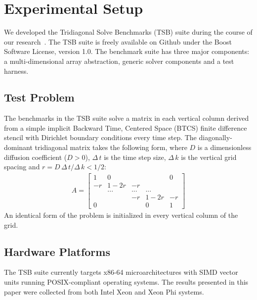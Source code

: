 \documentclass[10pt, conference, compsocconf]{IEEEtran}
\begin{document}
\section{Experimental Setup}
\label{sec:setup}
We developed the Tridiagonal Solve Benchmarks (TSB) suite during the course of
  our research~\cite{tsb_git}.
The TSB suite is freely available on Github under the Boost Software License,
  version 1.0.
The benchmark suite has three major components: a multi-dimensional array
  abstraction, generic solver components and a test harness.

\subsection{Test Problem}
\label{sec:setup:test_problem}

The benchmarks in the TSB suite solve a matrix in each vertical column derived
  from a simple implicit Backward Time, Centered Space (BTCS) finite difference
  stencil with Dirichlet boundary conditions every time step.
The diagonally-dominant tridiagonal matrix takes the following form,
  where \(D\) is a dimensionless diffusion coefficient (\(D > 0\)),
  \(\Delta \, t\) is the time step size, \(\Delta \, k\) is the vertical grid
  spacing and \(r=D \, \Delta \, t / \Delta \, k < 1/2\):
\begin{align*}
A = 
\begin{bmatrix}
1   & 0      &     &        & 0  \\
-r  & 1 - 2r & -r  &        &    \\
    & ...    & ... & ...    &    \\
    &        & -r  & 1 - 2r & -r \\
0   &        &     & 0      & 1
\end{bmatrix}  
\end{align*}
An identical form of the problem is initialized in every vertical column of the
  grid.

\subsection{Hardware Platforms}
\label{sec:setup:hardware_platforms}

The TSB suite currently targets x86-64 microarchitectures with SIMD vector units
  running POSIX-compliant operating systems.
The results presented in this paper were collected from both Intel Xeon and
  Xeon Phi systems.
\end{document}
